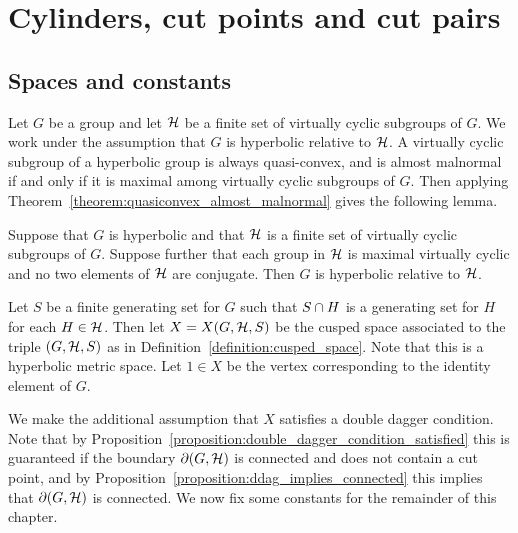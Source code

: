 \section{Cylinders, cut points and cut pairs} \label{section:geodesics}

\subsection{Spaces and constants} 

Let $G$ be a group and let $\mathcal{H}$ be a finite set of virtually cyclic subgroups of $G$.
We work under the assumption that $G$ is hyperbolic relative to $\mathcal{H}$.
A virtually cyclic subgroup of a hyperbolic group is always quasi-convex, and is almost malnormal if and only if it is maximal among virtually cyclic subgroups of $G$. 
Then applying Theorem~\ref{theorem:quasiconvex_almost_malnormal} gives the following lemma.

\begin{lemma}\label{lem:vcycperipheral} 
  Suppose that $G$ is hyperbolic and that $\mathcal{H}$ is a finite set of virtually cyclic subgroups of $G$.
  Suppose further that each group in $\mathcal{H}$ is maximal virtually cyclic and no two elements of $\mathcal{H}$ are conjugate.
  Then $G$ is hyperbolic relative to $\mathcal{H}$.
\end{lemma}

Let $S$ be a finite generating set for $G$ such that $S \cap H$ is a generating set for $H$ for each $H \in \mathcal{H}$.
Then let $X = X(G, \mathcal{H}, S)$ be the cusped space associated to the triple $(G, \mathcal{H}, S)$ as in Definition~\ref{definition:cusped_space}.
Note that this is a hyperbolic metric space.
Let $1 \in X$ be the vertex corresponding to the identity element of $G$.

We make the additional assumption that $X$ satisfies a double dagger condition.
Note that by Proposition~\ref{proposition:double_dagger_condition_satisfied} this is guaranteed if the boundary $\partial(G, \mathcal{H})$ is connected and does not contain a cut point, and by Proposition~\ref{proposition:ddag_implies_connected} this implies that $\partial(G, \mathcal{H})$ is connected.
We now fix some constants for the remainder of this chapter.

